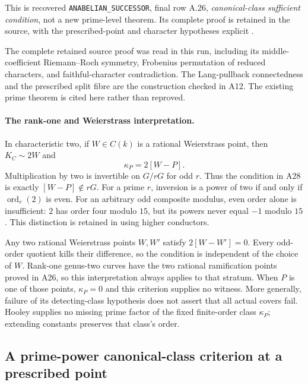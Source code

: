 \documentclass[11pt,a4paper]{article}
\begin{document}
This is recovered \texttt{ANABELIAN\_SUCCESSOR}, final row
A.26, \emph{canonical-class sufficient condition}, not a
new prime-level theorem.  Its complete proof is retained
in the source, with the prescribed-point and character
hypotheses explicit \cite[A.26]{ASrun}.

The complete retained source proof was read in this run, including
its middle-coefficient Riemann--Roch symmetry, Frobenius
permutation of reduced characters, and faithful-character
contradiction.  The Lang-pullback connectedness and the
prescribed split fibre are the construction checked in A12.
The existing prime theorem is cited here rather than reproved.


\paragraph{The rank-one and Weierstrass interpretation.}
In characteristic two, if $W\in C(k)$ is a rational
Weierstrass point, then $K_C\sim2W$ and
\[
                           \kappa_P=2[W-P].
\tag{RC.2}
\]
Multiplication by two is invertible on $G/rG$ for odd $r$.
Thus the condition in A28 is exactly
$[W-P]\notin rG$.
For a prime $r$, inversion is a power of two if and
only if $\operatorname{ord}_r(2)$ is even.
For an arbitrary odd composite modulus, even order
alone is insufficient: $2$ has order four modulo $15$,
but its powers never equal $-1$ modulo $15$.
This distinction is retained in using higher conductors.

Any two rational Weierstrass points $W,W'$ satisfy
$2[W-W']=0$.  Every odd-order quotient kills their
difference, so the condition is independent of the
choice of $W$.
Rank-one genus-two curves have the two rational
ramification points proved in A26, so this interpretation
always applies to that stratum.
When $P$ is one of those points, $\kappa_P=0$ and
this criterion supplies no witness.
More generally, failure of its detecting-class
hypothesis does not assert that all actual covers fail.
Hooley supplies no missing prime factor of the fixed
finite-order class $\kappa_P$; extending constants
preserves that class's order.


\subsection{A prime-power canonical-class criterion at a prescribed point}
\label{sec:prime-power-canonical}
\end{document}

